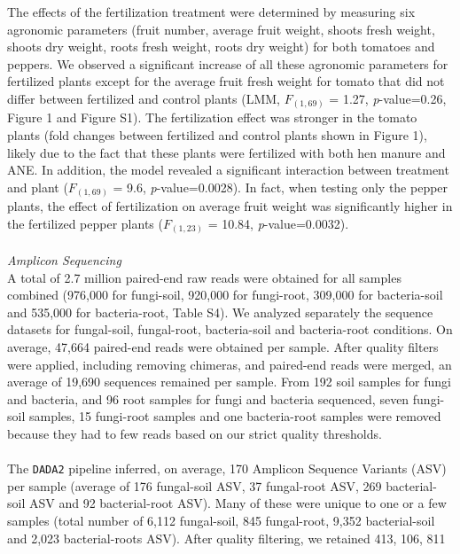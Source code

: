 \documentclass[12pt,]{article}
\begin{document}
The effects of the fertilization treatment were determined by measuring
six agronomic parameters (fruit number, average fruit weight, shoots
fresh weight, shoots dry weight, roots fresh weight, roots dry weight)
for both tomatoes and peppers. We observed a significant increase of all
these agronomic parameters for fertilized plants except for the average
fruit fresh weight for tomato that did not differ between fertilized and
control plants (LMM, \(F_{(1,69)}\) = 1.27, \emph{p}-value=0.26, Figure
1 and Figure S1). The fertilization effect was stronger in the tomato
plants (fold changes between fertilized and control plants shown in
Figure 1), likely due to the fact that these plants were fertilized with
both hen manure and ANE. In addition, the model revealed a significant
interaction between treatment and plant (\(F_{(1,69)}\) = 9.6,
\emph{p}-value=0.0028). In fact, when testing only the pepper plants,
the effect of fertilization on average fruit weight was significantly
higher in the fertilized pepper plants (\(F_{(1,23)}\) = 10.84,
\emph{p}-value=0.0032).\\
\hspace*{0.333em}\\
\emph{Amplicon Sequencing}\\
A total of 2.7 million paired-end raw reads were obtained for all
samples combined (976,000 for fungi-soil, 920,000 for fungi-root,
309,000 for bacteria-soil and 535,000 for bacteria-root, Table S4). We
analyzed separately the sequence datasets for fungal-soil, fungal-root,
bacteria-soil and bacteria-root conditions. On average, 47,664
paired-end reads were obtained per sample. After quality filters were
applied, including removing chimeras, and paired-end reads were merged,
an average of 19,690 sequences remained per sample. From 192 soil
samples for fungi and bacteria, and 96 root samples for fungi and
bacteria sequenced, seven fungi-soil samples, 15 fungi-root samples and
one bacteria-root samples were removed because they had to few reads
based on our strict quality thresholds.\\
\hspace*{0.333em}\\
The \texttt{DADA2} pipeline inferred, on average, 170 Amplicon Sequence
Variants (ASV) per sample (average of 176 fungal-soil ASV, 37
fungal-root ASV, 269 bacterial-soil ASV and 92 bacterial-root ASV). Many
of these were unique to one or a few samples (total number of 6,112
fungal-soil, 845 fungal-root, 9,352 bacterial-soil and 2,023
bacterial-roots ASV). After quality filtering, we retained 413, 106, 811
\end{document}
